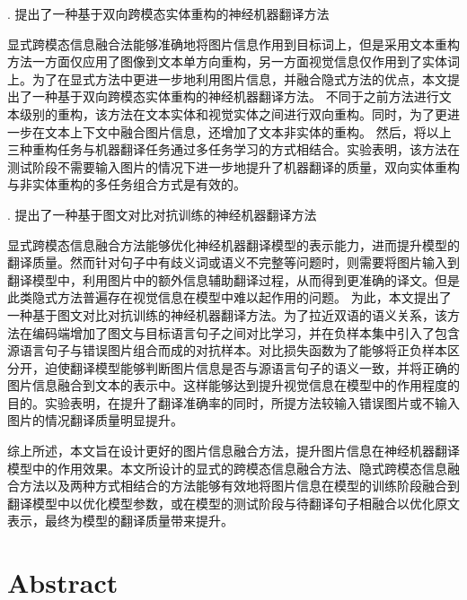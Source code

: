 {. 提出了一种基于双向跨模态实体重构的神经机器翻译方法}

显式跨模态信息融合法能够准确地将图片信息作用到目标词上，但是采用文本重构方法一方面仅应用了图像到文本单方向重构，另一方面视觉信息仅作用到了实体词上。为了在显式方法中更进一步地利用图片信息，并融合隐式方法的优点，本文提出了一种基于双向跨模态实体重构的神经机器翻译方法。
不同于之前方法进行文本级别的重构，该方法在文本实体和视觉实体之间进行双向重构。同时，为了更进一步在文本上下文中融合图片信息，还增加了文本非实体的重构。%
然后，将以上三种重构任务与机器翻译任务通过多任务学习的方式相结合。实验表明，该方法在测试阶段不需要输入图片的情况下进一步地提升了机器翻译的质量，双向实体重构与非实体重构的多任务组合方式是有效的。

{. 提出了一种基于图文对比对抗训练的神经机器翻译方法}

显式跨模态信息融合方法能够优化神经机器翻译模型的表示能力，进而提升模型的翻译质量。然而针对句子中有歧义词或语义不完整等问题时，则需要将图片输入到翻译模型中，利用图片中的额外信息辅助翻译过程，从而得到更准确的译文。但是此类隐式方法普遍存在视觉信息在模型中难以起作用的问题。
为此，本文提出了一种基于图文对比对抗训练的神经机器翻译方法。为了拉近双语的语义关系，该方法在编码端增加了图文与目标语言句子之间对比学习，并在负样本集中引入了包含源语言句子与错误图片组合而成的对抗样本。对比损失函数为了能够将正负样本区分开，迫使翻译模型能够判断图片信息是否与源语言句子的语义一致，并将正确的图片信息融合到文本的表示中。这样能够达到提升视觉信息在模型中的作用程度的目的。实验表明，在提升了翻译准确率的同时，所提方法较输入错误图片或不输入图片的情况翻译质量明显提升。

综上所述，本文旨在设计更好的图片信息融合方法，提升图片信息在神经机器翻译模型中的作用效果。本文所设计的显式的跨模态信息融合方法、隐式跨模态信息融合方法以及两种方式相结合的方法能够有效地将图片信息在模型的训练阶段融合到翻译模型中以优化模型参数，或在模型的测试阶段与待翻译句子相融合以优化原文表示，最终为模型的翻译质量带来提升。

\intobmk\chapter*{Abstract}%

